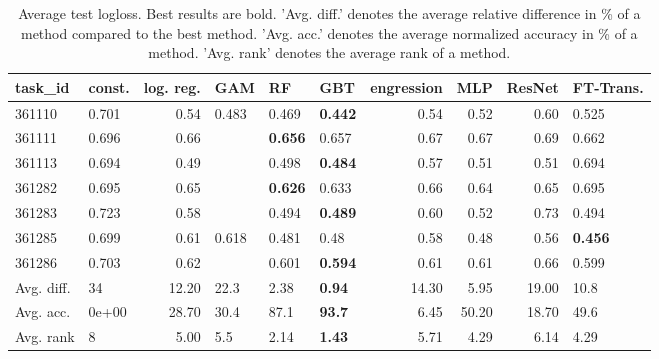 \begin{table}[ht!]
\centering
\begingroup\footnotesize
\begin{tabular}{llrlllrrrl}
  \hline
\hline
task\_id & const. & log. reg. & GAM & RF & GBT & engression & MLP & ResNet & FT-Trans. \\ 
  \hline
361110 & 0.701 & 0.54 & 0.483 & 0.469 & \textbf{0.442} & 0.54 & 0.52 & 0.60 & 0.525 \\ 
  361111 & 0.696 & 0.66 &  & \textbf{0.656} & 0.657 & 0.67 & 0.67 & 0.69 & 0.662 \\ 
  361113 & 0.694 & 0.49 &  & 0.498 & \textbf{0.484} & 0.57 & 0.51 & 0.51 & 0.694 \\ 
  361282 & 0.695 & 0.65 &  & \textbf{0.626} & 0.633 & 0.66 & 0.64 & 0.65 & 0.695 \\ 
  361283 & 0.723 & 0.58 &  & 0.494 & \textbf{0.489} & 0.60 & 0.52 & 0.73 & 0.494 \\ 
  361285 & 0.699 & 0.61 & 0.618 & 0.481 & 0.48 & 0.58 & 0.48 & 0.56 & \textbf{0.456} \\ 
  361286 & 0.703 & 0.62 &  & 0.601 & \textbf{0.594} & 0.61 & 0.61 & 0.66 & 0.599 \\ 
   \hline
Avg. diff. & 34 & 12.20 & 22.3 & 2.38 & \textbf{0.94} & 14.30 & 5.95 & 19.00 & 10.8 \\ 
  Avg. acc. & 0e+00 & 28.70 & 30.4 & 87.1 & \textbf{93.7} & 6.45 & 50.20 & 18.70 & 49.6 \\ 
  Avg. rank & 8 & 5.00 & 5.5 & 2.14 & \textbf{1.43} & 5.71 & 4.29 & 6.14 & 4.29 \\ 
   \hline
\hline
\end{tabular}
\endgroup
\caption{Average test logloss. 
                  Best results are bold. 
                  'Avg. diff.' denotes the average relative difference in \% of a method compared to the best method.
                  'Avg. acc.' denotes the average normalized accuracy in \% of a method.
                  'Avg. rank' denotes the average rank of a method.} 
\label{TABLES/table_results_logloss_clustering_num_and_cat_features}
\end{table}
